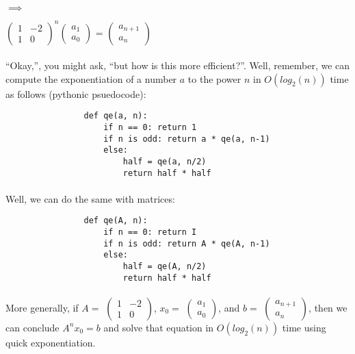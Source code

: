 \documentclass{article}
\begin{document}
            $\implies$
            \begin{center}
            	\(\begin{pmatrix}1 & -2\\1 & 0\end{pmatrix}^{n}\)\(\begin{pmatrix}a_{1}\\a_{0}\end{pmatrix}\) = 
                	\(\begin{pmatrix}a_{n+1}\\a_{n}\end{pmatrix}\)
            \end{center}
		\paragraph{}
        	``Okay,'', you might ask, ``but how is this more efficient?''.
            Well, remember, we can compute the exponentiation of a number $a$ to the power $n$ in $O(log_2(n))$ time as follows (pythonic psuedocode):
            \begin{verbatim}
                def qe(a, n):
                    if n == 0: return 1
                    if n is odd: return a * qe(a, n-1)
                    else:
                        half = qe(a, n/2)
                        return half * half
            \end{verbatim}
		\paragraph{}
        	Well, we can do the same with matrices:
            \begin{verbatim}
                def qe(A, n):
                    if n == 0: return I
                    if n is odd: return A * qe(A, n-1)
                    else:
                        half = qe(A, n/2)
                        return half * half
            \end{verbatim}
        \paragraph{}
        	More generally, 
            	if 
                	$A =$ \(\begin{pmatrix}1 & -2\\1 & 0\end{pmatrix}\), 
                    $x_0 = $ \(\begin{pmatrix}a_{1}\\a_{0}\end{pmatrix}\), and
                    $b = $ \(\begin{pmatrix}a_{n+1}\\a_{n}\end{pmatrix}\),
                then we can conclude $A^nx_0 = b$ and solve that equation in $O(log_2(n))$ time using quick exponentiation.
                
\end{document}

